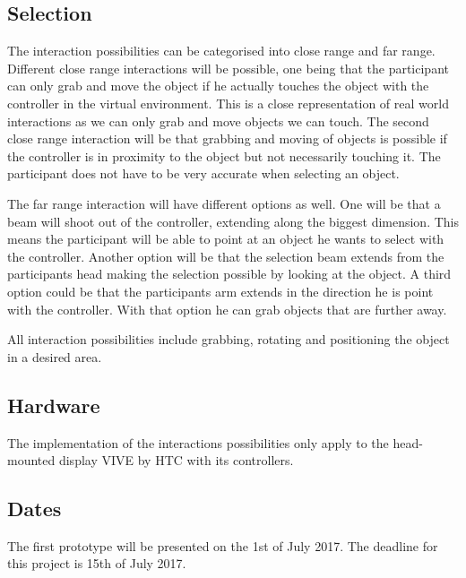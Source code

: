 \documentclass[a4paper, 12pt]{article}
\begin{document}
\subsection{Selection}
The interaction possibilities can be categorised into close range and far range. Different close range interactions will be possible, one being that the participant can only grab and move the object if he actually touches the object with the controller in the virtual environment. This is a close representation of real world interactions as we can only grab and move objects we can touch. 
The second close range interaction will be that grabbing and moving of objects is possible if the controller is in proximity to the object but not necessarily touching it. The participant does not have to be very accurate when selecting an object. 

The far range interaction will have different options as well. One will be that a beam will shoot out of the controller, extending along the biggest dimension. This means the participant will be able to point at an object he wants to select with the controller. 
Another option will be that the selection beam extends from the participants head making the selection possible by looking at the object. 
A third option could be that the participants arm extends in the direction he is point with the controller. With that option he can grab objects that are further away. 

All interaction possibilities include grabbing, rotating and positioning the object in a desired area.  

\subsection{Hardware}

The implementation of the interactions possibilities only apply to the head-mounted display VIVE by HTC with its controllers. 

\subsection{Dates}

The first prototype will be presented on the 1st of July 2017. The deadline for this project is 15th of July 2017.
\end{document}
